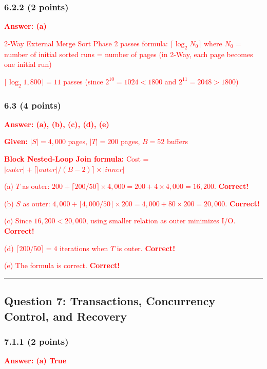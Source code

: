 \documentclass[11pt,a4paper]{article}
\begin{document}
\subsubsection*{6.2.2 (2 points)}
\textcolor{red}{\textbf{Answer: (a)}}

\textcolor{red}{2-Way External Merge Sort Phase 2 passes formula: $\lceil \log_2 N_0 \rceil$}
\textcolor{red}{where $N_0$ = number of initial sorted runs = number of pages (in 2-Way, each page becomes one initial run)}

\textcolor{red}{$\lceil \log_2 1,800 \rceil = 11$ passes (since $2^{10} = 1024 < 1800$ and $2^{11} = 2048 > 1800$)}

\subsubsection*{6.3 (4 points)}
\textcolor{red}{\textbf{Answer: (a), (b), (c), (d), (e)}}

\textcolor{red}{\textbf{Given:} $|S| = 4,000$ pages, $|T| = 200$ pages, $B = 52$ buffers}

\textcolor{red}{\textbf{Block Nested-Loop Join formula:} Cost = $|outer| + \lceil |outer|/(B-2) \rceil \times |inner|$}

\textcolor{red}{(a) $T$ as outer: $200 + \lceil 200/50 \rceil \times 4,000 = 200 + 4 \times 4,000 = 16,200$. \textbf{Correct!}}

\textcolor{red}{(b) $S$ as outer: $4,000 + \lceil 4,000/50 \rceil \times 200 = 4,000 + 80 \times 200 = 20,000$. \textbf{Correct!}}

\textcolor{red}{(c) Since $16,200 < 20,000$, using smaller relation as outer minimizes I/O. \textbf{Correct!}}

\textcolor{red}{(d) $\lceil 200/50 \rceil = 4$ iterations when $T$ is outer. \textbf{Correct!}}

\textcolor{red}{(e) The formula is correct. \textbf{Correct!}}

\hrule
\vspace{1em}

\subsection*{Question 7: Transactions, Concurrency Control, and Recovery}

\subsubsection*{7.1.1 (2 points)}
\textcolor{red}{\textbf{Answer: (a) True}}
\end{document}
